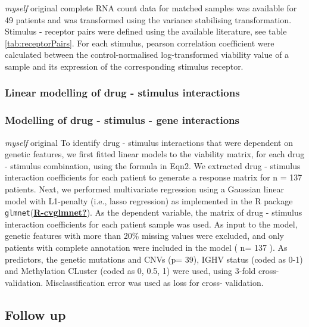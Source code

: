 \documentclass[11pt, a4paper, twosided]{book}
\begin{document}
\emph{myself} original complete
RNA count data for matched samples was available for 49 patients and was transformed using the variance stabilising transformation. Stimulus - receptor pairs were defined using the available literature, see table \ref{tab:receptorPairs}. For each stimulus, pearson correlation coefficient were calculated between the control-normalised log-transformed viability value of a sample and its expression of the corresponding stimulus receptor.

\hypertarget{linear-modelling-of-drug---stimulus-interactions}{%
\subsubsection{Linear modelling of drug - stimulus interactions}\label{linear-modelling-of-drug---stimulus-interactions}}

\hypertarget{modelling-of-drug---stimulus---gene-interactions}{%
\subsubsection{Modelling of drug - stimulus - gene interactions}\label{modelling-of-drug---stimulus---gene-interactions}}

\emph{myself} original
To identify drug - stimulus interactions that were dependent on genetic features, we first fitted linear models to the viability matrix, for each drug - stimulus combination, using the formula in Eqn2. We extracted drug - stimulus interaction coefficients for each patient to generate a response matrix for n = 137 patients. Next, we performed multivariate regression using a Gaussian linear model with L1-penalty (i.e., lasso regression) as implemented in the R package \texttt{glmnet}(\protect\hyperlink{ref-R-cvglmnet}{\textbf{R-cvglmnet?}}). As the dependent variable, the matrix of drug - stimulus interaction coefficients for each patient sample was used. As input to the model, genetic features with more than 20\% missing values were excluded, and only patients with complete annotation were included in the model ( n= 137 ). As predictors, the genetic mutations and CNVs (p= 39), IGHV status (coded as 0-1) and Methylation CLuster (coded as 0, 0.5, 1) were used, using 3-fold cross-validation. Misclassification error was used as loss for cross- validation.

\hypertarget{follow-up}{%
\subsection{Follow up}\label{follow-up}}
\end{document}
